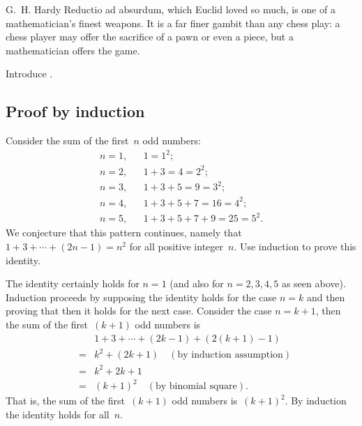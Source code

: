 \begin{draft}
\begin{quoted}{G.~H. Hardy}
Reductio ad absurdum, which Euclid loved so much, is one of a mathematician's finest weapons.  
It is a far finer gambit than any chess play: a chess player may offer the sacrifice of a pawn or even a piece, but a mathematician offers the game.
\end{quoted}

Introduce .




\subsection{Proof by induction}
\label{sec:pi}


\begin{example} 
Consider the sum of the first~\(n\) odd numbers:
\begin{eqnarray*}
n=1,&&1=1^2;\\
n=2,&&1+3=4=2^2;\\
n=3,&&1+3+5=9=3^2;\\
n=4,&&1+3+5+7=16=4^2;\\
n=5,&&1+3+5+7+9=25=5^2.
\end{eqnarray*}
We conjecture that this pattern continues, namely that \(1+3+\cdots+(2n-1)=n^2\) for all positive integer~\(n\).
Use induction to prove this identity.
\begin{solution} 
The identity certainly holds for \(n=1\) (and also for \(n=2,3,4,5\) as seen above).
Induction proceeds by supposing the identity holds for the case \(n=k\) and then proving that then it holds for the next case.
Consider the case \(n=k+1\), then the sum of the first~\((k+1)\) odd numbers is
\begin{eqnarray*}
&&1+3+\cdots+(2k-1)+(2(k+1)-1)\\
&=&k^2+(2k+1)\quad(\text{by induction assumption})\\
&=&k^2+2k+1\\
&=&(k+1)^2\quad(\text{by binomial square}).
\end{eqnarray*}
That is, the sum of the first~\((k+1)\) odd numbers is~\((k+1)^2\).
By induction the identity holds for all~\(n\).
\end{solution}
\end{example}





\sectionExercises




\end{draft}
